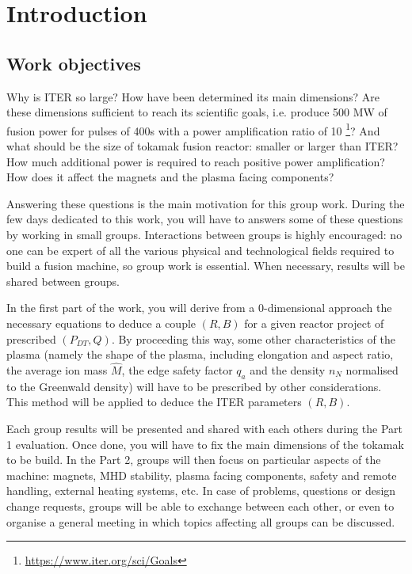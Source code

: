 \section{Introduction}
\subsection{Work objectives}
Why is ITER so large? How have been determined its main dimensions? Are these dimensions sufficient to reach its scientific goals,  i.e. produce 500 MW of fusion power for pulses of 400s with a power amplification ratio of 10 \footnote{\url{https://www.iter.org/sci/Goals}}? And what should be the size of tokamak fusion reactor: smaller or larger than ITER? How much additional power is required to reach positive power amplification? How does it affect the magnets and the plasma facing components? 

Answering these questions is the main motivation for this group work. During the few days dedicated to this work, you will have to answers some of these questions by working in small groups. Interactions between groups is highly encouraged: no one can be expert of all the various physical and technological fields required to build a fusion machine, so group work is essential. When necessary, results will be shared between groups.

In the first part of the work, you will derive from a 0-dimensional approach the necessary equations to deduce a couple $(R, B)$ for a given reactor project of prescribed $(P_{DT}, Q)$. By proceeding this way, some other characteristics of the plasma (namely the shape of the plasma, including elongation and aspect ratio, the average ion mass $\hat M$, the edge safety factor $q_a$ and the density $n_N$ normalised to the Greenwald density) will have to be prescribed by other considerations. This method will be applied to deduce the ITER parameters $(R, B)$. 

Each group results will be presented and shared with each others during the Part 1 evaluation. Once done, you will have to fix the main dimensions of the tokamak to be build. In the Part 2, groups will then focus on particular aspects of the machine: magnets, MHD stability, plasma facing components, safety and remote handling, external heating systems, etc. In case of problems, questions or design change requests, groups will be able to exchange between each other, or even to organise a general meeting in which topics affecting all groups can be discussed.

